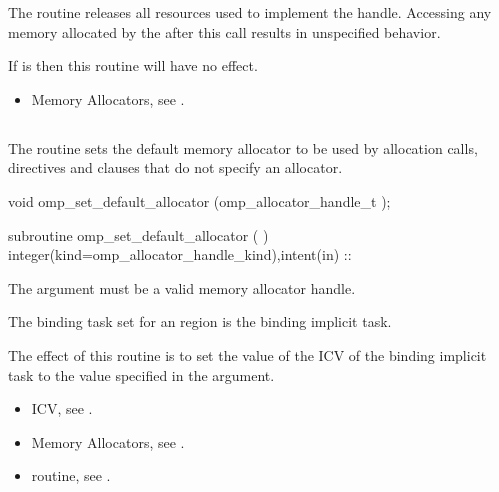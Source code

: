 \effect
The  routine releases all resources used 
to implement the  handle. Accessing any memory allocated 
by the  after this call results in unspecified behavior.

If  is  then this routine will have no effect.
 
\crossreferences
\begin{itemize}
\item Memory Allocators, see .
\end{itemize}



\subsection{}
\label{subsec:omp_set_default_allocator}

\summary
The  routine sets the default memory 
allocator to be used by allocation calls,  directives 
and  clauses that do not specify an allocator.

\format
\begin{ccppspecific}
\begin{ompcFunction}
void omp_set_default_allocator (omp_allocator_handle_t );
\end{ompcFunction}
\end{ccppspecific}

\begin{fortranspecific}
\begin{ompfSubroutine}
subroutine omp_set_default_allocator (  )
integer(kind=omp_allocator_handle_kind),intent(in) :: 
\end{ompfSubroutine}
\end{fortranspecific}

\constraints
The  argument must be a valid memory allocator handle.

\binding
The binding task set for an  region 
is the binding implicit task.

\effect
The effect of this routine is to set the value of the 
 ICV of the binding implicit task to the value 
specified in the  argument.

\crossreferences
\begin{itemize}
\item {} ICV, see .

\item Memory Allocators, see .

\item {} routine, see .
\end{itemize}



